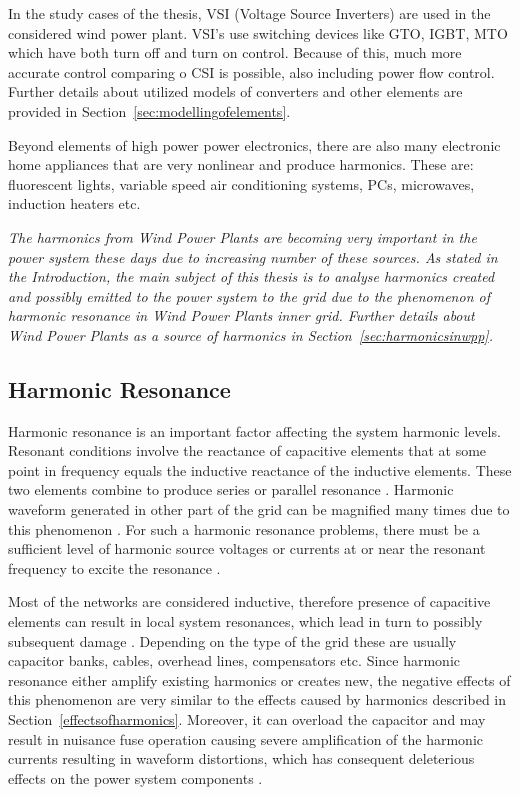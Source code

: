 \documentclass[12pt]{report} %
\begin{document}
In the study cases of the thesis, VSI (Voltage Source Inverters) are used in the considered wind power plant. VSI’s use switching devices like GTO, IGBT, MTO which have both turn off and turn on control. Because of this, much more accurate control comparing o CSI is possible, also including power flow control. Further details about utilized models of converters and other elements are provided in Section~\ref{sec:modellingofelements}.

Beyond elements of high power power electronics, there are also many electronic home appliances that are very nonlinear and produce harmonics. These are: fluorescent lights, variable speed air conditioning systems, PCs, microwaves, induction heaters etc.

\textit{The harmonics from Wind Power Plants are becoming very important in the power system these days due to increasing number of these sources. As stated in the Introduction, the main subject of this thesis is to analyse harmonics created and possibly emitted to the power system to the grid due to the phenomenon of harmonic resonance in Wind Power Plants inner grid. Further details about Wind Power Plants as a source of harmonics in Section~\ref{sec:harmonicsinwpp}.}

\subsection{Harmonic Resonance} \label{sec:harmonicresonance}
Harmonic resonance is an important factor affecting the system harmonic levels. Resonant conditions involve the reactance of capacitive elements that at some point in frequency equals the inductive reactance of the inductive elements. These two elements combine to produce series or parallel resonance \cite{rosa}. Harmonic waveform generated in other part of the grid can be magnified many times due to this phenomenon \cite{das}. For such a harmonic resonance problems, there must be a sufficient level of harmonic source voltages or currents at or near the resonant frequency to excite the resonance \cite{bradt2012}.

Most of the networks are considered inductive, therefore presence of capacitive elements can result in local system resonances, which lead in turn to possibly subsequent damage \cite{arrillaga}. Depending on the type of the grid these are usually capacitor banks, cables, overhead lines, compensators etc. Since harmonic resonance either amplify existing harmonics or creates new, the negative effects of this phenomenon are very similar to the effects caused by harmonics described in Section~\ref{effectsofharmonics}. Moreover, it can overload the capacitor and may result in nuisance fuse operation causing severe amplification of the harmonic currents resulting in waveform distortions, which has consequent deleterious effects on the power system components \cite{das}.
\end{document}
